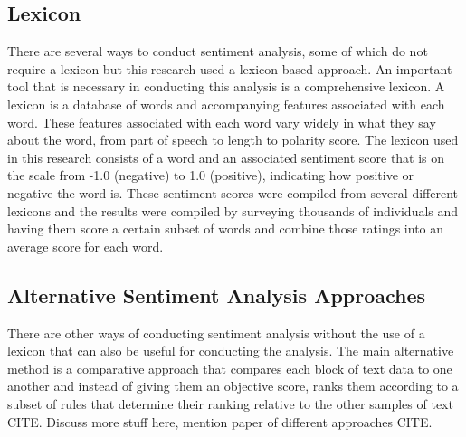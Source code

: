 \subsection{Lexicon}
There are several ways to conduct sentiment analysis, some of which do not require a lexicon but this research used a lexicon-based approach.
An important tool that is necessary in conducting this analysis is a comprehensive lexicon.
A lexicon is a database of words and accompanying features associated with each word.
These features associated with each word vary widely in what they say about the word, from part of speech to length to polarity score.
The lexicon used in this research consists of a word and an associated sentiment score that is on the scale from -1.0 (negative) to 1.0 (positive), indicating how positive or negative the word is.
These sentiment scores were compiled from several different lexicons and the results were compiled by surveying thousands of individuals and having them score a certain subset of words and combine those ratings into an average score for each word.

\subsection{Alternative Sentiment Analysis Approaches}
There are other ways of conducting sentiment analysis without the use of a lexicon that can also be useful for conducting the analysis.
The main alternative method is a comparative approach that compares each block of text data to one another and instead of giving them an objective score, ranks them according to a subset of rules that determine their ranking relative to the other samples of text CITE.
Discuss more stuff here, mention paper of different approaches CITE.


